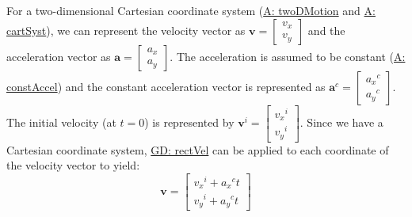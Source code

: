 \documentclass[12pt]{article}
\begin{document}
For a two-dimensional Cartesian coordinate system (\hyperref[twoDMotion]{A: twoDMotion} and \hyperref[cartSyst]{A: cartSyst}), we can represent the velocity vector as $\mathbf{v}=\begin{bmatrix}
{v_{x}}\\
{v_{y}}
\end{bmatrix}$ and the acceleration vector as $\mathbf{a}=\begin{bmatrix}
{a_{x}}\\
{a_{y}}
\end{bmatrix}$. The acceleration is assumed to be constant (\hyperref[constAccel]{A: constAccel}) and the constant acceleration vector is represented as ${\mathbf{a}^{c}}=\begin{bmatrix}
{{a_{x}}^{c}}\\
{{a_{y}}^{c}}
\end{bmatrix}$. The initial velocity (at $t=0$) is represented by ${\mathbf{v}^{i}}=\begin{bmatrix}
{{v_{x}}^{i}}\\
{{v_{y}}^{i}}
\end{bmatrix}$. Since we have a Cartesian coordinate system, \hyperref[GD:rectVel]{GD: rectVel} can be applied to each coordinate of the velocity vector to yield:
\begin{displaymath}
\mathbf{v}=\begin{bmatrix}
{{v_{x}}^{i}}+{{a_{x}}^{c}} t\\
{{v_{y}}^{i}}+{{a_{y}}^{c}} t
\end{bmatrix}
\end{displaymath}
\par~
\end{document}
